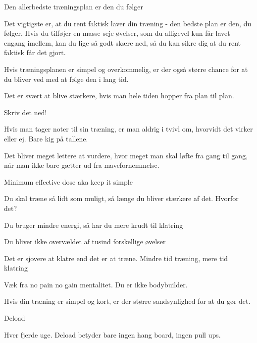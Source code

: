 \begin{multicols}{2}
  \begin{tList}{Den allerbedste træningsplan er den du følger}
  \item Det vigtigste er, at du rent faktisk laver din træning - den
    bedste plan er den, du følger. Hvis du tilføjer en masse seje
    øvelser, som du alligevel kun får lavet engang imellem, kan du
    lige så godt skære ned, så du kan sikre dig at du rent faktisk
    får det gjort.
  \item Hvis træningsplanen er simpel og overkommelig, er der også
    større chance for at du bliver ved med at følge den i lang tid.
  \item  Det er svært at blive stærkere, hvis man hele tiden hopper
    fra plan til plan.
  \end{tList}

  \begin{tList}{Skriv det ned!}
  \item Hvis man tager noter til sin træning, er man aldrig i tvivl
    om, hvorvidt det virker eller ej. Bare kig på tallene.
  \item Det bliver meget lettere at vurdere, hvor meget man skal
    løfte fra gang til gang, når man ikke bare gætter ud fra mavefornemmelse.
  \end{tList}

  \begin{tList}{Minimum effective dose aka keep it simple}
  \item Du skal træne så lidt som muligt, så længe du bliver stærkere
    af det. Hvorfor det?

  \item Du bruger mindre energi, så har du mere krudt til klatring
  \item Du bliver ikke overvældet af tusind forskellige øvelser
  \item Det er sjovere at klatre end det er at træne. Mindre tid
    træning, mere tid klatring

  \item Væk fra no pain no gain mentalitet. Du er ikke bodybuilder.
  \item Hvis din træning er simpel og kort, er der større
    sandsynlighed for at du gør det.
  \end{tList}

  \begin{tList}{Deload}

  \item Hver fjerde uge. Deload betyder bare ingen hang board, ingen pull ups.


\end{tList}
\end{multicols}
